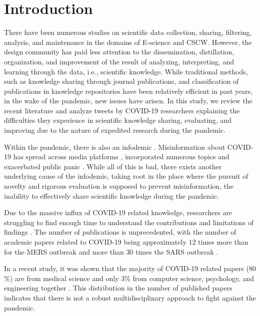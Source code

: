 \documentclass[acmsmall,authordraft]{acmart}
\begin{document}
\section{Introduction}
\label{Introduction}



There have been numerous studies on scientific data collection, sharing, filtering, analysis, and maintenance in the domains of E-science and CSCW. However, the design community has paid less attention to the dissemination, distillation, organization, and improvement of the result of analyzing, interpreting, and learning through the data, i.e., scientific knowledge. While traditional methods, such as knowledge sharing through journal publications, and classification of publications in knowledge repositories have been relatively efficient in past years, in the wake of the pandemic, new issues have arisen. In this study, we review the recent literature and analyze tweets by COVID-19 researchers explaining the difficulties they experience in scientific knowledge sharing, evaluating, and improving due to the nature of expedited research during the pandemic.

Within the pandemic, there is also an infodemic \citep{WHO2020Munich}. Misinformation about COVID-19 has spread across media platforms \citep{cuan2020misinformation, pennycook2020fighting}, incorporated numerous topics \citep{brennen2020types} and exacerbated public panic \citep{depoux2020pandemic}. While all of this is bad, there exists another underlying cause of the infodemic, taking root in the place where the pursuit of novelty and rigorous evaluation is supposed to prevent misinformation, the inability to effectively share scientific knowledge during the pandemic. 

Due to the massive influx of COVID-19 related knowledge, researchers are struggling to find enough time to understand the contributions and limitations of findings \citep{Brainard2020drowning}. The number of publications is unprecedented, with the number of academic papers related to COVID-19 being approximately $12$ times more than for the MERS outbreak and more than $30$ times the SARS outbreak \citep{haghani2020scientific}. 

In a recent study, it was shown that the majority of COVID-19 related papers ($80$\%) are from medical science and only $3$\% from computer science, psychology, and engineering together \cite{haghani2020covid}. This distribution in the number of published papers indicates that there is not a robust multidisciplinary approach to fight against the pandemic.
\end{document}

